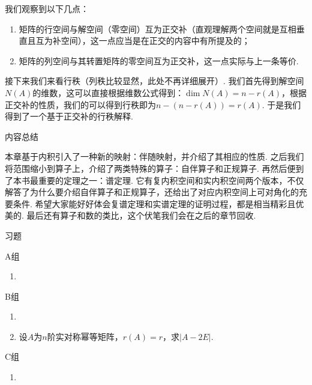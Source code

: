 我们观察到以下几点：
\begin{enumerate}
    \item 矩阵的行空间与解空间（零空间）互为正交补（直观理解两个空间就是互相垂直且互为补空间），这一点应当是在正交的内容中有所提及的；

    \item 矩阵的列空间与其转置矩阵的零空间互为正交补，这一点实际与上一条等价.
\end{enumerate}

接下来我们来看行秩（列秩比较显然，此处不再详细展开）. 我们首先得到解空间$N(A)$的维数，这可以直接根据维数公式得到：$\dim N(A) = n-r(A)$，根据正交补的性质，我们的可以得到行秩即为$n-(n-r(A))=r(A)$. 于是我们得到了一个基于正交补的行秩解释.

\vspace{2ex}
\centerline{\heiti \Large 内容总结}

本章基于内积引入了一种新的映射：伴随映射，并介绍了其相应的性质. 之后我们将范围缩小到算子上，介绍了两类特殊的算子：自伴算子和正规算子. 再然后便到了本书最重要的定理之一：谱定理. 它有复内积空间和实内积空间两个版本，不仅解答了为什么要介绍自伴算子和正规算子，还给出了对应内积空间上可对角化的充要条件. 希望大家能好好体会复谱定理和实谱定理的证明过程，都是相当精彩且优美的. 最后还有算子和数的类比，这个伏笔我们会在之后的章节回收.

\vspace{2ex}
\centerline{\heiti \Large 习题}

\vspace{2ex}
{\kaishu }
\begin{flushright}
    \kaishu

\end{flushright}

\centerline{\heiti A组}
\begin{enumerate}
    \item
\end{enumerate}

\centerline{\heiti B组}
\begin{enumerate}
    \item \item 设$A$为$n$阶实对称幂等矩阵，$r(A)=r$，求$|A-2E|$.
\end{enumerate}

\centerline{\heiti C组}
\begin{enumerate}
    \item
\end{enumerate}
